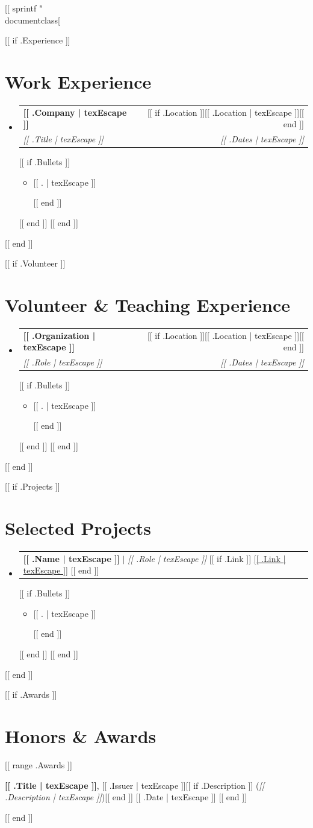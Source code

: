 [[ sprintf "\\documentclass[%
\makeatletter
\newcommand{\resumeItem}[1]{
  \item\small{
    {#1 \vspace{-2pt}}
  }
}
\newcommand{\resumeSubheading}[4]{
  \vspace{-1pt}\item
    \begin{tabular*}{0.97\textwidth}[t]{l@{\extracolsep{\fill}}r}
      \textbf{#1} & #2 \\
      \textit{\small#3} & \textit{\small #4} \\
    \end{tabular*}\vspace{-7pt}
}
\newcommand{\resumeProjectHeading}[2]{
    \item
    \begin{tabular*}{0.97\textwidth}{l@{\extracolsep{\fill}}r}
      \small#1 & #2 \\
    \end{tabular*}\vspace{-7pt}
}
\newcommand{\resumeSubHeadingListStart}{\begin{itemize}[leftmargin=0.15in, label={}]}
\newcommand{\resumeSubHeadingListEnd}{\end{itemize}}
\newcommand{\resumeItemListStart}{\begin{itemize}}
\newcommand{\resumeItemListEnd}{\end{itemize}\vspace{-5pt}}
\makeatother
\begin{document}
[[ if .Experience ]]
\section{Work Experience}
  \resumeSubHeadingListStart
    [[ range .Experience ]]
    \resumeSubheading
      {[[ .Company | texEscape ]]}{[[ if .Location ]][[ .Location | texEscape ]][[ end ]]}
      {[[ .Title | texEscape ]]}{[[ .Dates | texEscape ]]}
      [[ if .Bullets ]]
      \resumeItemListStart
        [[ range texLines .Bullets ]]\resumeItem{[[ . | texEscape ]]}
        [[ end ]]
      \resumeItemListEnd
      [[ end ]]
    [[ end ]]
  \resumeSubHeadingListEnd
[[ end ]]

[[ if .Volunteer ]]
\section{Volunteer \& Teaching Experience}
  \resumeSubHeadingListStart
    [[ range .Volunteer ]]
    \resumeSubheading
      {[[ .Organization | texEscape ]]}{[[ if .Location ]][[ .Location | texEscape ]][[ end ]]}
      {[[ .Role | texEscape ]]}{[[ .Dates | texEscape ]]}
      [[ if .Bullets ]]
      \resumeItemListStart
        [[ range texLines .Bullets ]]\resumeItem{[[ . | texEscape ]]}
        [[ end ]]
      \resumeItemListEnd
      [[ end ]]
    [[ end ]]
  \resumeSubHeadingListEnd
[[ end ]]

[[ if .Projects ]]
\section{Selected Projects}
    \resumeSubHeadingListStart
      [[ range .Projects ]]
      \resumeProjectHeading
          {\textbf{[[ .Name | texEscape ]]} $|$ \emph{[[ .Role | texEscape ]]} [[ if .Link ]] \href{[[ .Link | texEscape ]]}{[[ .Link | texEscape ]]} [[ end ]]} {}
          [[ if .Bullets ]]
          \resumeItemListStart
            [[ range texLines .Bullets ]]\resumeItem{[[ . | texEscape ]]}
            [[ end ]]
          \resumeItemListEnd
          [[ end ]]
      [[ end ]]
    \resumeSubHeadingListEnd
[[ end ]]


[[ if .Awards ]]
\section{Honors \& Awards}
 \begin{itemize}[leftmargin=0.15in, label={}]
    \small{
     [[ range .Awards ]]
     \item \textbf{[[ .Title | texEscape ]]}, [[ .Issuer | texEscape ]][[ if .Description ]] (\textit{[[ .Description | texEscape ]]})[[ end ]] \hfill [[ .Date | texEscape ]]
     [[ end ]]
    }
 \end{itemize}
[[ end ]]
\end{document}

